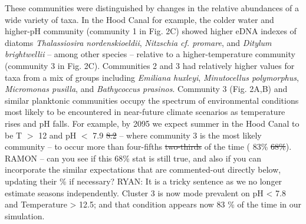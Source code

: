 \documentclass[11pt]{article}
\begin{document}
\begin{linenumbers}
These communities were distinguished by changes in the relative abundances of a wide variety of taxa. In the Hood Canal for example, the colder water and higher-pH community (community 1 in Fig. 2C) showed higher eDNA indexes of diatoms \textit{Thalassiosira nordenskioeldii}, \textit{Nitzschia cf. promare}, and \textit{Ditylum brightwellii} -- among other species -- relative to a higher-temperature community (community 3 in Fig. 2C). Communities 2 and 3 had relatively higher values for taxa from a mix of groups including \textit{Emiliana huxleyi}, \textit{Minutocellus polymorphus}, \textit{Micromonas pusilla}, and \textit{Bathycoccus prasinos}. Community 3 (Fig. 2A,B) and similar planktonic communities occupy the spectrum of environmental conditions most likely to be encountered in near-future climate scenarios as temperature rises and pH falls. For example, by 2095 we expect summer in the Hood Canal to be T $>$ 12 and pH $<$ {\color{red} 7.9  \st{8.2}} -- where community 3 is the most likely community -- to occur more than {\color{red} four-fifths \st{two-thirds}} of the time ({\color{red} 83\%  \st{68\%}}). {\color{red} RAMON -- can you see if this 68\% stat is still true, and also if you can incorporate the similar expectations that are commented-out directly below, updating their \% if necessary?} RYAN: It is a tricky sentence as we no longer estimate seasons independently. Cluster 3 is now mode prevalent on pH < 7.8 and Temperature > 12.5; and that condition appears now 83 \% of the time in our simulation.   \\





\end{linenumbers}
\end{document}
